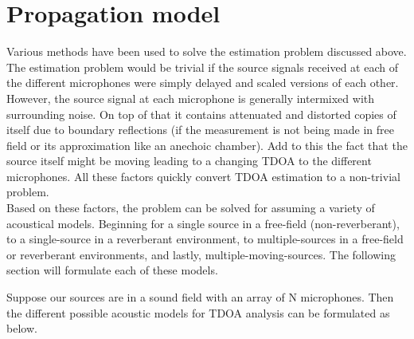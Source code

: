 \chapter{Propagation model}
Various methods have been used \cite{benesty2008microphone} to solve the estimation problem discussed above. The estimation problem would be trivial if the source signals received at each of the different microphones were simply delayed and scaled versions of each other. However, the source signal at each microphone is generally intermixed with surrounding noise. On top of that it contains attenuated and distorted copies of itself due to boundary reflections (if the measurement is not being made in free field or its approximation like an anechoic chamber). Add to this the fact that the source itself might be moving leading to a changing TDOA to the different microphones. All these factors quickly convert TDOA estimation to a non-trivial problem. \\
Based on these factors, the problem can be solved for assuming a variety of acoustical models. Beginning for a single source in a free-field (non-reverberant), to a single-source in a reverberant environment, to multiple-sources in a free-field or reverberant environments, and lastly, multiple-moving-sources. The following section will formulate each of these models.

Suppose our sources are in a sound field with an array of N microphones. Then the different possible acoustic models for TDOA analysis can be formulated as below.

